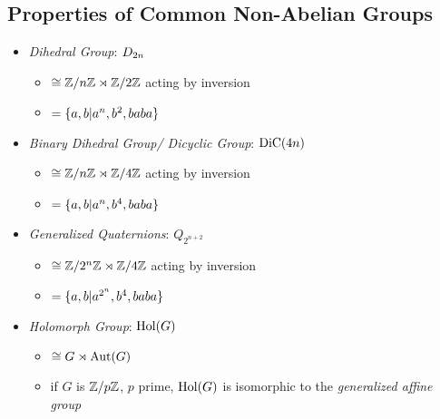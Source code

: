     \subsection*{Properties of Common Non-Abelian Groups}
    \begin{itemize}
        \item \textit{Dihedral Group}: $D_{2n}$
        \begin{itemize}
            \item  $\cong \mathbb{Z}/n\mathbb{Z} \rtimes \mathbb{Z}/2\mathbb{Z}$ acting by inversion
            \item $=\{a, b | a^n, b^2, baba\}$
        \end{itemize}

        \item \textit{Binary Dihedral Group/ Dicyclic Group}: $\text{DiC}(4n)$
        \begin{itemize}
            \item  $\cong \mathbb{Z}/n\mathbb{Z} \rtimes \mathbb{Z}/4\mathbb{Z}$ acting by inversion
            \item $=\{a, b | a^n, b^4, baba\}$
        \end{itemize}

        \item \textit{Generalized Quaternions}: $Q_{2^{n+2}}$
        \begin{itemize}
            \item  $\cong \mathbb{Z}/2^n\mathbb{Z} \rtimes \mathbb{Z}/4\mathbb{Z}$ acting by inversion
            \item $=\{a, b | a^{2^n}, b^4, baba\}$
        \end{itemize}

        \item \textit{Holomorph Group}: $\text{Hol}(G)$
        \begin{itemize}
            \item  $\cong G \rtimes \text{Aut}(G)$ 
            \item if $G$ is $\mathbb{Z}/p\mathbb{Z}$, $p$ prime, $\text{Hol}(G)$ is isomorphic to the \textit{generalized affine group} 
        \end{itemize}
    \end{itemize}

